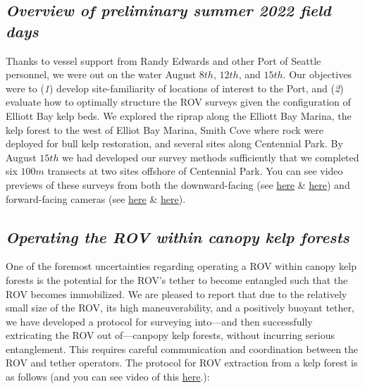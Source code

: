 \documentclass[11pt]{article}
\begin{document}
\subsection{\textit{Overview of preliminary summer 2022 field days}}
Thanks to vessel support from Randy Edwards and other Port of Seattle personnel, we were out on the water August $8th$, $12th$, and $15th$. 
Our objectives were to 
(\textit{1}) develop site-familiarity of locations of interest to the 
Port, and
(\textit{2}) evaluate how to optimally structure the ROV surveys given the configuration of Elliott Bay kelp beds.
We explored the riprap along the Elliott Bay Marina, the kelp forest to 
the west of Elliot Bay Marina, Smith Cove where rock were deployed for 
bull kelp restoration, and several sites along Centennial Park.
By August $15th$ we had developed our survey methods sufficiently that 
we completed six $100m$ transects at two sites offshore of Centennial Park. 
You can see video previews of these surveys from both the 
downward-facing (see 
\href{https://drive.google.com/file/d/1BKpNbOoVZD69AsEt5G7JsOrkMyZvgtjx/view?usp=sharing}{here}
 \& 
\href{https://drive.google.com/file/d/1J8xVqzrCSNAGh-g5ZEFoMboQgHW_H4rA/view?usp=sharing}{here})
 and forward-facing cameras (see 
 \href{https://drive.google.com/file/d/1RK28xmY8yo-FMqfbQtPPxmdujq9r2AEu/view?usp=sharing}{here}
 \& 
\href{https://drive.google.com/file/d/1OGcqmQaU9CvSFK4At0ju36zfMBRCUGUl/view?usp=sharing}{here}).

\subsection{\textit{Operating the ROV within canopy kelp forests}}
One of the foremost uncertainties regarding operating a ROV within 
canopy kelp forests is the potential for the ROV's tether to become 
entangled such that the ROV becomes immobilized.  
We are pleased to report that due to the relatively small size of the 
ROV, its high maneuverability, and a positively buoyant tether, we have 
developed a protocol for surveying into---and then successfully 
extricating the ROV out of---canpopy kelp forests, without incurring serious entanglement.
This requires careful communication and coordination between the ROV 
and tether operators. 
The protocol for ROV extraction from a kelp forest is as follows (and 
you can see video of this 
\href{https://drive.google.com/file/d/1qdtdPwB8RHkjL27RRzu95MTenNgszDAC/view?usp=sharing}{here}.):
\end{document}
